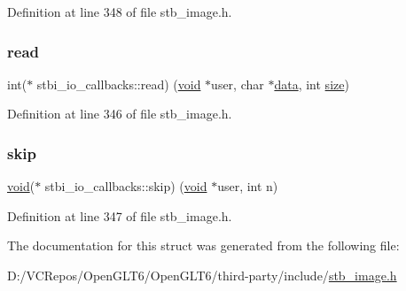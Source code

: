Definition at line 348 of file stb\+\_\+image.\+h.

\mbox{\label{structstbi__io__callbacks_a623e46b3a2a019611601409926283a88}} 
\subsubsection{\texorpdfstring{read}{read}}
{\footnotesize\ttfamily int($\ast$ stbi\+\_\+io\+\_\+callbacks\+::read) (\mbox{\hyperlink{glad_8h_a950fc91edb4504f62f1c577bf4727c29}{void}} $\ast$user, char $\ast$\mbox{\hyperlink{glad_8h_a0f78eecb0891cce3bdfc815b971866a1}{data}}, int \mbox{\hyperlink{glad_8h_a79ef9eb3e59c4bb34c4b9fbeb8d28ff7}{size}})}



Definition at line 346 of file stb\+\_\+image.\+h.

\mbox{\label{structstbi__io__callbacks_a257aac5480a90a6c4b8fbe86c1b01068}} 
\subsubsection{\texorpdfstring{skip}{skip}}
{\footnotesize\ttfamily \mbox{\hyperlink{glad_8h_a950fc91edb4504f62f1c577bf4727c29}{void}}($\ast$ stbi\+\_\+io\+\_\+callbacks\+::skip) (\mbox{\hyperlink{glad_8h_a950fc91edb4504f62f1c577bf4727c29}{void}} $\ast$user, int n)}



Definition at line 347 of file stb\+\_\+image.\+h.



The documentation for this struct was generated from the following file\+:\begin{DoxyCompactItemize}
\item 
D\+:/\+V\+C\+Repos/\+Open\+G\+L\+T6/\+Open\+G\+L\+T6/third-\/party/include/\mbox{\hyperlink{stb__image_8h}{stb\+\_\+image.\+h}}\end{DoxyCompactItemize}
